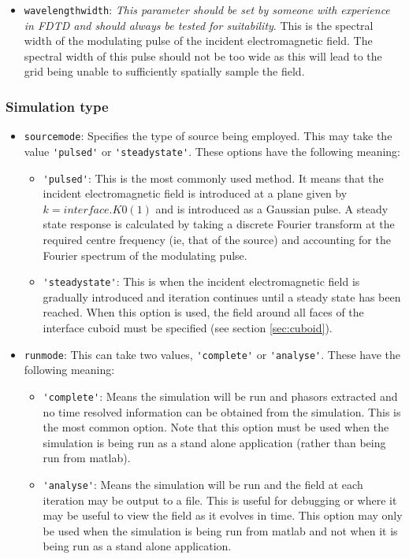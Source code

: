 \documentclass[a4paper, 12pt]{article}
\begin{document}
\begin{itemize}
		\item \verb+wavelengthwidth+: \emph{This parameter should be set by someone
			with experience in FDTD and should always be tested for
			suitability}. This is the spectral width of the modulating pulse of
		the incident electromagnetic field. The spectral width of this pulse
		should not be too wide as this will lead to the grid being unable to
		sufficiently spatially sample the field. 
	\end{itemize}
	\subsubsection{Simulation type}
	\begin{itemize}
		\item \verb+sourcemode+: Specifies the type of source being
		employed. This may take the value \verb+'pulsed'+ or
		\verb+'steadystate'+. These options have the following meaning:
		\begin{itemize}
			\item \verb+'pulsed'+: This is the most commonly used method. It
			means that the incident electromagnetic field is introduced at a
			plane given by $k=interface.K0(1)$ and is introduced as a Gaussian
			pulse. A steady state response is calculated by taking a discrete
			Fourier transform at the required centre frequency (ie, that of
			the source) and accounting for the Fourier spectrum of the
			modulating pulse.
			\item
			\verb+'steadystate'+:
			This is when the incident electromagnetic field is gradually
			introduced and iteration continues until a steady state has been
			reached. When this option is used, the field around all faces of
			the interface cuboid must be specified (see section
			\ref{sec:cuboid}). 
		\end{itemize}
		\item \verb+runmode+: This can take two values, \verb+'complete'+ or
		\verb+'analyse'+. These have the following meaning:
		\begin{itemize}
			\item \verb+'complete'+: Means the simulation will be run and phasors
			extracted and no time resolved information can be obtained from the
			simulation. This is the most common option. Note that this option
			must be used when the simulation is being run as a stand alone
			application (rather than being run from matlab).
			\item \verb+'analyse'+: Means the simulation will be run and the field
			at each iteration may be output to a file. This is useful for
			debugging or where it may be useful to view the field as it evolves
			in time. This option may only be used when the simulation is being
			run from matlab and not when it is being run as a stand alone application.  
		\end{itemize}
	\end{itemize}
\end{document}
